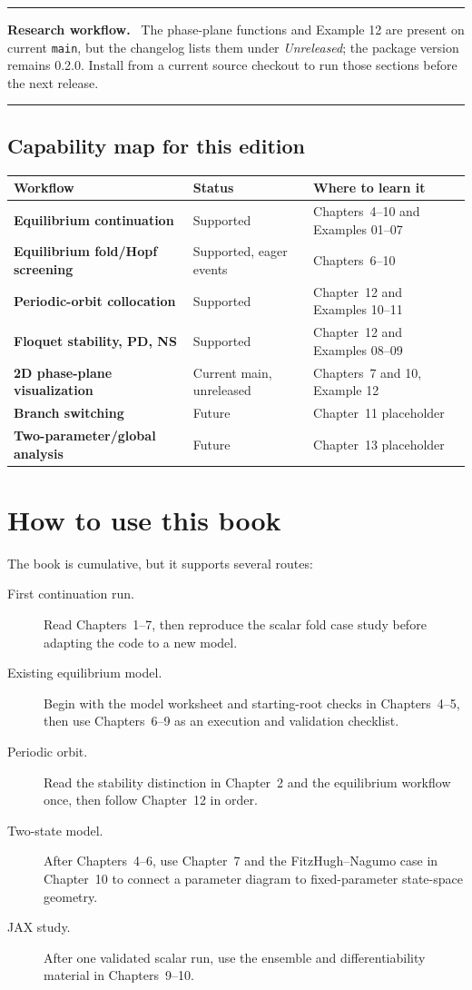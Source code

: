 \documentclass[11pt,oneside]{book}
\newenvironment{workflowbox}
  {\par\medskip\noindent\begin{minipage}{\textwidth}
   \color{JaxGreen!70!black}\rule{\textwidth}{0.8pt}\par
   \textbf{Research workflow.}\ \color{black}}
  {\par\color{JaxGreen!70!black}\rule{\textwidth}{0.8pt}
   \end{minipage}\par\medskip}
\begin{document}
\begin{workflowbox}
The phase-plane functions and Example 12 are present on current
\texttt{main}, but the changelog lists them under \emph{Unreleased}; the
package version remains 0.2.0. Install from a current source checkout to run
those sections before the next release.
\end{workflowbox}

\section*{Capability map for this edition}

\begin{tabularx}{\textwidth}{>{\bfseries}p{}p{}X}
\toprule
Workflow & Status & Where to learn it\\
\midrule
Equilibrium continuation & Supported & Chapters~4--10 and Examples 01--07\\
Equilibrium fold/Hopf screening & Supported, eager events & Chapters~6--10\\
Periodic-orbit collocation & Supported & Chapter~12 and Examples 10--11\\
Floquet stability, PD, NS & Supported & Chapter~12 and Examples 08--09\\
2D phase-plane visualization & Current main, unreleased & Chapters~7 and 10,
Example 12\\
Branch switching & Future & Chapter~11 placeholder\\
Two-parameter/global analysis & Future & Chapter~13 placeholder\\
\bottomrule
\end{tabularx}

\chapter*{How to use this book}

The book is cumulative, but it supports several routes:

\begin{description}
  \item[First continuation run.] Read Chapters~1--7, then reproduce the scalar
        fold case study before adapting the code to a new model.
  \item[Existing equilibrium model.] Begin with the model worksheet and
        starting-root checks in Chapters~4--5, then use Chapters~6--9 as an
        execution and validation checklist.
  \item[Periodic orbit.] Read the stability distinction in Chapter~2 and the
        equilibrium workflow once, then follow Chapter~12 in order.
  \item[Two-state model.] After Chapters~4--6, use Chapter~7 and the
        FitzHugh--Nagumo case in Chapter~10 to connect a parameter diagram to
        fixed-parameter state-space geometry.
  \item[JAX study.] After one validated scalar run, use the ensemble and
        differentiability material in Chapters~9--10.
\end{description}
\end{document}
